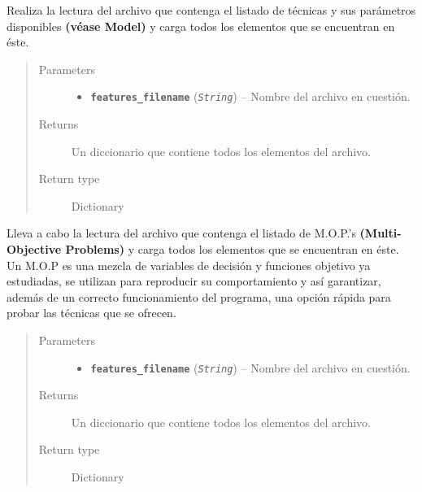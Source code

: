 \documentclass[class=report, crop=false]{standalone}
\begin{document}
\begin{fulllineitems}
\begin{fulllineitems}
\end{fulllineitems}

\begin{fulllineitems}

Realiza la lectura del archivo que contenga el listado de técnicas 
y sus parámetros disponibles \textbf{(véase Model)} y 
carga todos los elementos que se encuentran en éste.

\begin{quote}\begin{description}
\item[{Parameters}] \leavevmode\begin{itemize}
\item \textbf{\texttt{features\_filename}} (\emph{\texttt{String}}) -- Nombre del archivo en cuestión.
\end{itemize}
\item[{Returns}] \leavevmode
Un diccionario que contiene todos los elementos del archivo.
\item[{Return type}] \leavevmode
Dictionary
\end{description}\end{quote}

\end{fulllineitems}

\begin{fulllineitems}

Lleva a cabo la lectura del archivo que contenga el listado de M.O.P.'s 
\textbf{(Multi-Objective Problems)} y carga todos los elementos 
que se encuentran en éste.\break
Un M.O.P es una mezcla de variables de decisión y funciones 
objetivo ya estudiadas, se utilizan para reproducir su comportamiento 
y así garantizar, además de un correcto funcionamiento del programa, 
una opción rápida para probar las técnicas que se ofrecen.

\begin{quote}\begin{description}
\item[{Parameters}] \leavevmode\begin{itemize}
\item \textbf{\texttt{features\_filename}} (\emph{\texttt{String}}) -- Nombre del archivo en cuestión.
\end{itemize}
\item[{Returns}] \leavevmode
Un diccionario que contiene todos los elementos del archivo.
\item[{Return type}] \leavevmode
Dictionary
\end{description}\end{quote}


\end{fulllineitems}
\end{fulllineitems}
\end{document}
